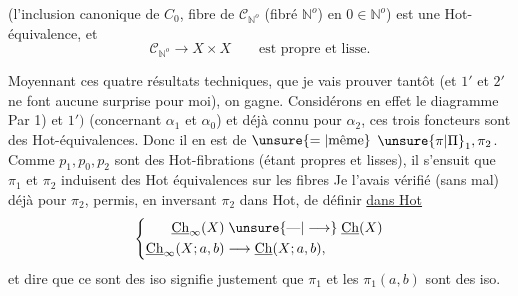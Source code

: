 (l'inclusion canonique de $C_0$, fibre de $\mathcal C_{\mathbb N^o}$ (fibré  $\mathbb N^o$) en $0\in\mathbb N^o$) est une Hot-équivalence, et
\begingroup\makeatletter\tagsleft@true\makeatother
\[
\mathcal C_{\mathbb N^o}\longrightarrow X\times X\qquad\text{est propre et lisse.}\tag*{$2')$}
\]
\endgroup

Moyennant ces  quatre résultats techniques, que je vais prouver tantôt (et $1'$ et $2'$ ne font aucune surprise pour moi), on gagne. Considérons en effet le diagramme
Par 1) et $1')$ (concernant $\alpha_1$ et $\alpha_0$) et 
 déjà connu pour $\alpha_2$, ces trois foncteurs sont des Hot-équivalences. Donc il en est de $\unsure{=|\text{même}}$  $\unsure{\pi|\Pi}_1,\pi_2$. Comme $p_1,p_0,p_2$ sont des Hot-fibrations (étant propres et lisses), il s'ensuit que $\pi_1$ et $\pi_2$ induisent des Hot équivalences sur les fibres
Je l'avais vérifié (sans mal) déjà pour $\pi_2$,   permis, en inversant $\pi_2$ dans Hot, de définir \uline{dans Hot}
\[
\left\{\begin{aligned}
\underline{\mathrm{Ch}}_\infty(X)&\mathrel{\unsure{\text{---}|\longrightarrow}}\underline{\mathrm{Ch}}(X)\\
\underline{\mathrm{Ch}}_\infty(X;a,b)&\longrightarrow\underline{\mathrm{Ch}}(X;a,b),
\end{aligned}\right.
\]
et dire que ce sont des iso signifie justement que $\pi_1$ et les $\pi_1(a,b)$ sont des iso.

